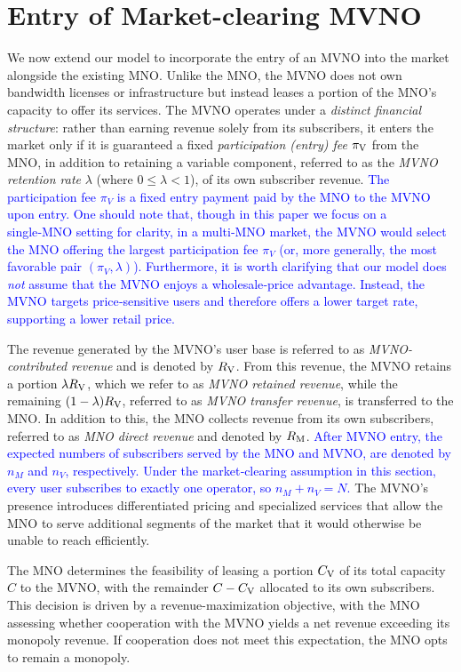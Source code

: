 \documentclass[12pt, draftclsnofoot, onecolumn]{IEEEtran}
\begin{document}
	
	\section{Entry of Market-clearing MVNO}
	We now extend our model to incorporate the entry of an MVNO into the market alongside the existing MNO. Unlike the MNO, the MVNO does not own bandwidth licenses or infrastructure but instead leases a portion of the MNO’s capacity to offer its services. The MVNO operates under a \emph{distinct financial structure}: rather than earning revenue solely from its subscribers, it enters the market only if it is guaranteed a fixed \emph{participation (entry) fee} \( \pi_{\rm V} \) from the MNO, in addition to retaining a variable component, referred to as the \emph{MVNO retention rate} \( \lambda \) (where \( 0 \leq \lambda < 1 \)), of its own subscriber revenue. 
	\textcolor{blue}{The participation fee $\pi_V$ is a fixed entry payment paid by the MNO to the MVNO upon entry. One should note that, though in this paper we focus on a single‑MNO setting for clarity, in a multi‑MNO market, the MVNO would select the MNO offering the largest participation fee $\pi_V$ (or, more generally, the most favorable pair $(\pi_V,\lambda)$). Furthermore, it is worth clarifying that our model does \emph{not} assume that the MVNO enjoys a wholesale‑price advantage. Instead, the MVNO targets price‑sensitive users and therefore offers a lower target rate, supporting a lower retail price.}
	
	The revenue generated by the MVNO’s user base is referred to as \emph{MVNO-contributed revenue} and is denoted by \( R_{\rm V} \). From this revenue, the MVNO retains a portion \( \lambda R_{\rm V} \), which we refer to as \emph{MVNO retained revenue}, while the remaining \( (1 - \lambda) R_{\rm V} \), referred to as \emph{MVNO transfer revenue}, is transferred to the MNO. In addition to this, the MNO collects revenue from its own subscribers, referred to as \emph{MNO direct revenue} and denoted by \( R_{\rm M} \). \textcolor{blue}{After MVNO entry, the expected numbers of subscribers served by the MNO and MVNO, are denoted by $n_M$ and $n_V$, respectively. Under the market‑clearing assumption in this section, every user subscribes to exactly one operator, so $n_M + n_V = N$.} The MVNO’s presence introduces differentiated pricing and specialized services that allow the MNO to serve additional segments of the market that it would otherwise be unable to reach efficiently.
	
	
	
	
	The MNO determines the feasibility of leasing a portion \( C_{\rm V} \) of its total capacity \( C \) to the MVNO, with the remainder \( C - C_{\rm V} \) allocated to its own subscribers. %
		This decision is driven by a revenue-maximization objective, with the MNO assessing whether cooperation with the MVNO yields a net revenue exceeding its monopoly revenue. If cooperation does not meet this expectation, the MNO opts to remain a monopoly.
		
\end{document}
